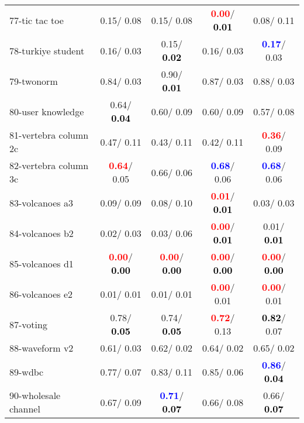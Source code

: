 \begin{table}[h]
\begin{center}
\begin{tabular}{lc|c|c|c}
77-tic tac toe &   0.15/  0.08 &   0.15/  0.08 & \textcolor{red}{\textbf{  0.00}}/\textcolor{black}{\textbf{  0.01}} &   0.08/  0.11 \\
78-turkiye student &   0.16/  0.03 &   0.15/\textcolor{black}{\textbf{  0.02}} &   0.16/  0.03 & \textcolor{blue}{\textbf{  0.17}}/  0.03 \\ \hline
79-twonorm &   0.84/  0.03 &   0.90/\textcolor{black}{\textbf{  0.01}} &   0.87/  0.03 &   0.88/  0.03 \\
80-user knowledge &   0.64/\textcolor{black}{\textbf{  0.04}} &   0.60/  0.09 &   0.60/  0.09 &   0.57/  0.08 \\
81-vertebra column 2c &   0.47/  0.11 &   0.43/  0.11 &   0.42/  0.11 & \textcolor{red}{\textbf{  0.36}}/  0.09 \\
82-vertebra column 3c & \textcolor{red}{\textbf{  0.64}}/  0.05 &   0.66/  0.06 & \textcolor{blue}{\textbf{  0.68}}/  0.06 & \textcolor{blue}{\textbf{  0.68}}/  0.06 \\
83-volcanoes a3 &   0.09/  0.09 &   0.08/  0.10 & \textcolor{red}{\textbf{  0.01}}/\textcolor{black}{\textbf{  0.01}} &   0.03/  0.03 \\
84-volcanoes b2 &   0.02/  0.03 &   0.03/  0.06 & \textcolor{red}{\textbf{  0.00}}/\textcolor{black}{\textbf{  0.01}} &   0.01/\textcolor{black}{\textbf{  0.01}} \\
85-volcanoes d1 & \textcolor{red}{\textbf{  0.00}}/\textcolor{black}{\textbf{  0.00}} & \textcolor{red}{\textbf{  0.00}}/\textcolor{black}{\textbf{  0.00}} & \textcolor{red}{\textbf{  0.00}}/\textcolor{black}{\textbf{  0.00}} & \textcolor{red}{\textbf{  0.00}}/\textcolor{black}{\textbf{  0.00}} \\ \hline
86-volcanoes e2 &   0.01/  0.01 &   0.01/  0.01 & \textcolor{red}{\textbf{  0.00}}/  0.01 & \textcolor{red}{\textbf{  0.00}}/  0.01 \\
87-voting &   0.78/\textcolor{black}{\textbf{  0.05}} &   0.74/\textcolor{black}{\textbf{  0.05}} & \textcolor{red}{\textbf{  0.72}}/  0.13 & \textcolor{black}{\textbf{  0.82}}/  0.07 \\
88-waveform v2 &   0.61/  0.03 &   0.62/  0.02 &   0.64/  0.02 &   0.65/  0.02 \\
89-wdbc &   0.77/  0.07 &   0.83/  0.11 &   0.85/  0.06 & \textcolor{blue}{\textbf{  0.86}}/\textcolor{black}{\textbf{  0.04}} \\
90-wholesale channel &   0.67/  0.09 & \textcolor{blue}{\textbf{  0.71}}/\textcolor{black}{\textbf{  0.07}} &   0.66/  0.08 &   0.66/\textcolor{black}{\textbf{  0.07}} \\

\end{tabular}
\end{center}
\end{table}
